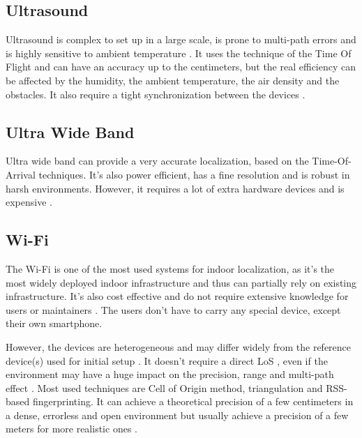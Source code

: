 \subsection{Ultrasound}

Ultrasound is complex to set up in a large scale, is prone to multi-path errors and is highly sensitive to ambient temperature \cite{mainetti_survey_2014}. It uses the technique of the Time Of Flight and can have an accuracy up to the centimeters, but the real efficiency can be affected by the humidity, the ambient temperature, the air density and the obstacles. It also require a tight synchronization between the devices \cite{shang_overview_2022} \cite{mainetti_survey_2014}.

\subsection{Ultra Wide Band}

Ultra wide band can provide a very accurate localization, based on the Time-Of-Arrival techniques. It's also power efficient, has a fine resolution and is robust in harsh environments. However, it requires a lot of extra hardware devices \cite{spachos_ble_2020} and is expensive \cite{shang_overview_2022}.

\subsection{Wi-Fi}

The Wi-Fi is one of the most used systems for indoor localization, as it's the most widely deployed indoor infrastructure and thus can partially rely on existing infrastructure. It's also cost effective \cite{mainetti_survey_2014} and do not require extensive knowledge for users or maintainers \cite{shang_overview_2022}. The users don't have to carry any special device, except their own smartphone.

However, the devices are heterogeneous and may differ widely from the reference device(s) used for initial setup \cite{liu_survey_2020}. It doesn't require a direct LoS \cite{mainetti_survey_2014}, even if the environment may have a huge impact on the precision, range and multi-path effect \cite{liu_survey_2020}. Most used techniques are Cell of Origin method, triangulation and RSS-based fingerprinting. It can achieve a theoretical precision of a few centimeters in a dense, errorless and open environment but usually achieve a precision of a few meters for more realistic ones \cite{liu_survey_2020}.

